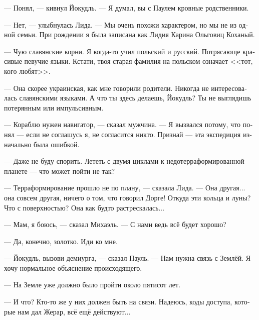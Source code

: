 \documentclass[a4paper,10pt,fleqn]{book}\usepackage{polyglossia}\setdefaultlanguage[babelshorthands=true]{russian}\setotherlanguage{english}\defaultfontfeatures{Ligatures=TeX,Mapping=tex-text}\usepackage{xcolor}\newcommand{\ml}[3]{#2}
\newcommand{\asterism}{\vspace{1em}{\centering\Large\bfseries$\ast~\ast~\ast$\par}\vspace{1em}}
\begin{document}
--- Понял, --- кивнул Йокудль.
--- Я думал, вы с Паулем кровные родственники.

--- Нет, --- улыбнулась Лида.
--- Мы очень похожи характером, но мы не из одной семьи.
\ml{$0$}
{При рождении я была записана как Лидия Карина Ольговиц Коханый.}
{At birth I was registered as Lidia Karina Olgowitz Kochany.''}

\ml{$0$}
{--- Чую славянские корни.}
{``I recognize Slavic roots.}
Я когда-то учил польский и русский.
Потрясающе красивые певучие языки.
\ml{$0$}
{Кстати, твоя старая фамилия на польском означает <<тот, кого любят>>.}
{By the way, your deadname means `the one who are loved' in Polish.''}

\ml{$0$}
{--- Она скорее украинская, как мне говорили родители.}
{``It's more of Ukrainian, my parents told me.}
\ml{$0$}
{Никогда не интересовалась славянскими языками.}
{I've never been interested in Slavonic languages.}
\ml{$0$}
{А что ты здесь делаешь, Йокудль?}
{What are you doing here, Jökull?}
\ml{$0$}
{Ты не выглядишь потерянным или импульсивным.}
{You don't look lost or impulsive.''}

--- Кораблю нужен навигатор, --- сказал мужчина.
--- Я вызвался потому, что понял --- если не соглашусь я, не согласится никто.
\ml{$0$}
{Признай --- эта экспедиция изначально была ошибкой.}
{Admit it, this expedition was just a big mistake from the beginning.''}

\ml{$0$}
{--- Даже не буду спорить.}
{``I wouldn't argue with that.}
\ml{$0$}
{Лететь с двумя циклами к недотерраформированной планете --- что может пойти не так?}
{A two-cycle flight to the incompletely terraformed planet, what can go wrong?''}

\asterism

--- Терраформирование прошло не по плану, --- сказала Лида.
--- Она другая... она совсем другая, ничего о том, что говорил Дорге!
Откуда эти кольца и луны?
Что с поверхностью?
Она как будто растрескалась...

--- Мам, я боюсь, --- сказал Михаэль.
--- С нами ведь всё будет хорошо?

--- Да, конечно, золотко.
Иди ко мне.

--- Йокудль, вызови демиурга, --- сказал Пауль.
--- Нам нужна связь с Землёй.
Я хочу нормальное объяснение происходящего.

--- На Земле уже должно было пройти около пятисот лет.

--- И что?
Кто-то же у них должен быть на связи.
Надеюсь, коды доступа, которые нам дал Жерар, всё ещё действуют...
\end{document}
